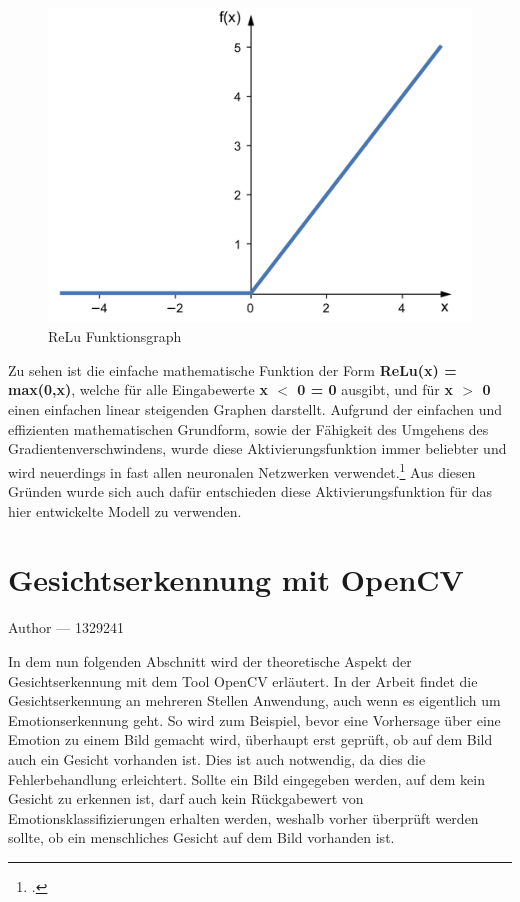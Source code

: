 \documentclass[12pt, a4paper]{report}
\makeatletter
\newcommand*\setcaptioncitation[1]{\def\captioncitation{\textit{Quelle:}~#1}}
\let\captioncitation\relax
\newcommand{\sectionauthor}[1]{%
  {\parindent0pt\vspace*{-5pt}%
  \large{Author --- }
  \linespread{1.1}\large\scshape#1%
  \par\nobreak\vspace*{35pt} }
  \@afterheading%
}
\makeatother
\begin{document}
\begin{figure}[H]
\includegraphics[width=\linewidth]{Bilder/relu.png}
\setcaptioncitation{https://sebastianraschka.com/images/faq/relu-derivative/relu\_3.png}
\caption{ReLu Funktionsgraph}
\label{fig: ReLu}
\end{figure}
Zu sehen ist die einfache mathematische Funktion der Form \textbf{ReLu(x) = max(0,x)}, welche für alle Eingabewerte \textbf{x $<$ 0 = 0} ausgibt, und für \textbf{x $>$ 0} einen einfachen linear steigenden Graphen darstellt. Aufgrund der einfachen und effizienten mathematischen Grundform, sowie der Fähigkeit des Umgehens des Gradientenverschwindens, wurde diese Aktivierungsfunktion immer beliebter und wird neuerdings in fast allen neuronalen Netzwerken verwendet.\footcite[Vgl.][]{Aktivierungsfunktion2}
\newline
Aus diesen Gründen wurde sich auch dafür entschieden diese Aktivierungsfunktion für das hier entwickelte Modell zu verwenden.

\section{Gesichtserkennung mit OpenCV}
\sectionauthor{1329241}
In dem nun folgenden Abschnitt wird der theoretische Aspekt der Gesichtserkennung mit dem Tool OpenCV erläutert. In der Arbeit findet die Gesichtserkennung an mehreren Stellen Anwendung, auch wenn es eigentlich um Emotionserkennung geht. So wird zum Beispiel, bevor eine Vorhersage über eine Emotion zu einem Bild gemacht wird, überhaupt erst geprüft, ob auf dem Bild auch ein Gesicht vorhanden ist. Dies ist auch notwendig, da dies die Fehlerbehandlung erleichtert. Sollte ein Bild eingegeben werden, auf dem kein Gesicht zu erkennen ist, darf auch kein Rückgabewert von Emotionsklassifizierungen erhalten werden, weshalb vorher überprüft werden sollte, ob ein menschliches Gesicht auf dem Bild vorhanden ist.
\end{document}
